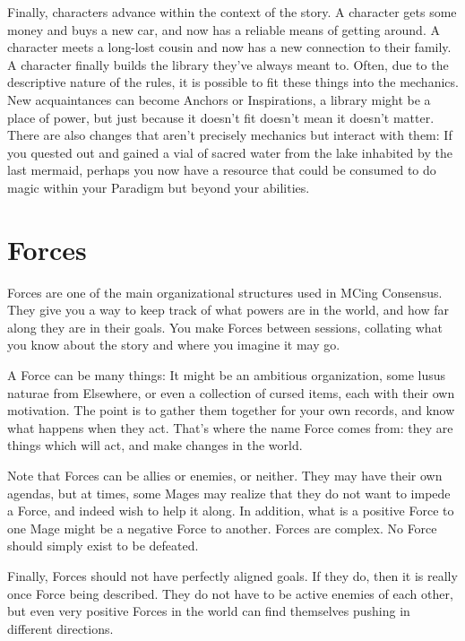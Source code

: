 \documentclass[
]{article}
\begin{document}
Finally, characters advance within the context of the story. A character
gets some money and buys a new car, and now has a reliable means of
getting around. A character meets a long-lost cousin and now has a new
connection to their family. A character finally builds the library
they've always meant to. Often, due to the descriptive nature of the
rules, it is possible to fit these things into the mechanics. New
acquaintances can become Anchors or Inspirations, a library might be a
place of power, but just because it doesn't fit doesn't mean it doesn't
matter. There are also changes that aren't precisely mechanics but
interact with them: If you quested out and gained a vial of sacred water
from the lake inhabited by the last mermaid, perhaps you now have a
resource that could be consumed to do magic within your Paradigm but
beyond your abilities.

\newpage

\hypertarget{forces-2}{%
\section{Forces}\label{forces-2}}

Forces are one of the main organizational structures used in MCing
Consensus. They give you a way to keep track of what powers are in the
world, and how far along they are in their goals. You make Forces
between sessions, collating what you know about the story and where you
imagine it may go.

A Force can be many things: It might be an ambitious organization, some
lusus naturae from Elsewhere, or even a collection of cursed items, each
with their own motivation. The point is to gather them together for your
own records, and know what happens when they act. That's where the name
Force comes from: they are things which will act, and make changes in
the world.

Note that Forces can be allies or enemies, or neither. They may have
their own agendas, but at times, some Mages may realize that they do not
want to impede a Force, and indeed wish to help it along. In addition,
what is a positive Force to one Mage might be a negative Force to
another. Forces are complex. No Force should simply exist to be
defeated.

Finally, Forces should not have perfectly aligned goals. If they do,
then it is really once Force being described. They do not have to be
active enemies of each other, but even very positive Forces in the world
can find themselves pushing in different directions.
\end{document}

